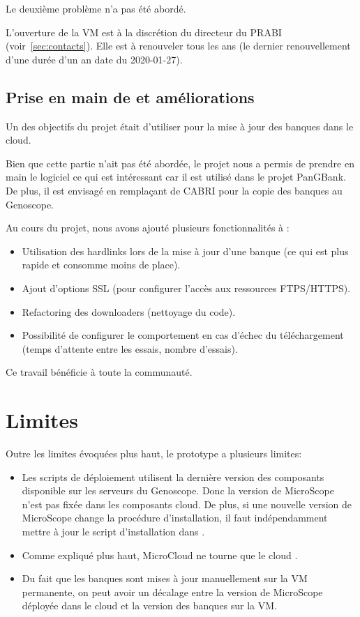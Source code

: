 Le deuxième problème n'a pas été abordé.

\begin{warningbox}
    L'ouverture de la VM est à la discrétion du directeur du PRABI (voir~\autoref{sec:contacts}).
    Elle est à renouveler tous les ans (le dernier renouvellement d'une durée d'un an date du 2020-01-27).
\end{warningbox}

\subsection{Prise en main de  et améliorations}\label{subsec:biomaj}

Un des objectifs du projet était d'utiliser  pour la mise à jour des banques dans le cloud.

Bien que cette partie n'ait pas été abordée, le projet nous a permis de prendre en main le logiciel
ce qui est intéressant car il est utilisé dans le projet PanGBank.
De plus, il est envisagé en remplaçant de CABRI pour la copie des banques au Genoscope.

Au cours du projet, nous avons ajouté plusieurs fonctionnalités à :
\begin{itemize}
    \item Utilisation des hardlinks lors de la mise à jour d'une banque (ce qui est plus rapide et consomme moins de place).
    \item Ajout d'options SSL (pour configurer l'accès aux ressources FTPS/HTTPS).
    \item Refactoring des downloaders (nettoyage du code).
    \item Possibilité de configurer le comportement en cas d'échec du téléchargement (temps d'attente entre les essais, nombre d'essais).
\end{itemize}

Ce travail bénéficie à toute la communauté.

\section{Limites}

Outre les limites évoquées plus haut, le prototype a plusieurs limites:
\begin{itemize}
    \item Les scripts de déploiement utilisent la dernière version des composants disponible sur les serveurs du Genoscope.
          Donc la version de MicroScope n'est pas fixée dans les composants cloud.
          De plus, si une nouvelle version de MicroScope change la procédure d'installation,
          il faut indépendamment mettre à jour le script d'installation dans .
    \item Comme expliqué plus haut, MicroCloud ne tourne que le cloud .
    \item Du fait que les banques sont mises à jour manuellement sur la VM permanente, on peut avoir un décalage entre la version de MicroScope déployée dans le cloud
          et la version des banques sur la VM.
\end{itemize}

